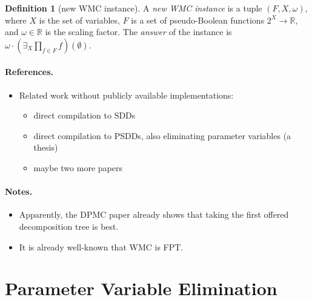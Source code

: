 \documentclass{article}
\theoremstyle{definition}
\newtheorem{definition}{Definition}
\theoremstyle{remark}
\begin{document}
\begin{definition}[new WMC instance] \label{def:new_wmc}
  A \emph{new WMC instance} is a tuple $(F, X, \omega)$, where $X$ is the set of
  variables, $F$ is a set of pseudo-Boolean functions $2^X \to \mathbb{R}$, and
  $\omega \in \mathbb{R}$ is the scaling factor. The \emph{answer} of the
  instance is $\omega \cdot \left(\exists_X\prod_{f \in F}f\right)(\emptyset)$.
\end{definition}

\paragraph{References.}
\begin{itemize}
\item Related work without publicly available implementations:
  \begin{itemize}
  \item direct compilation to SDDs \cite{DBLP:conf/ecsqaru/ChoiKD13}
  \item direct compilation to PSDDs, also eliminating parameter variables (a thesis)
  \item maybe two more papers
  \end{itemize}
\end{itemize}

\paragraph{Notes.}
\begin{itemize}
\item Apparently, the \textsc{DPMC} paper already shows that taking the first
  offered decomposition tree is best.
\item It is already well-known that WMC is FPT.
\end{itemize}

\section{Parameter Variable Elimination}
\end{document}
